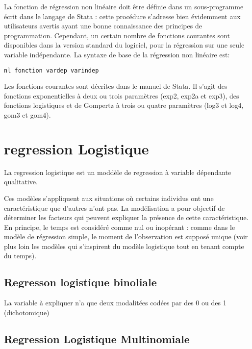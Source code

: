 \documentclass[
]{book}
\begin{document}
La fonction de régression non linéaire doit être définie dans un
sous-programme écrit dans le langage de Stata : cette procédure
s'adresse bien évidemment aux utilisateurs avertis ayant une
bonne connaissance des principes de programmation.
Cependant, un certain nombre de fonctions courantes sont
disponibles dans la version standard du logiciel, pour la
régression sur une seule variable indépendante. La syntaxe de
base de la régression non linéaire est:

\texttt{nl\ fonction\ vardep\ varindep}

Les fonctions courantes sont décrites dans le manuel de Stata. Il
s'agit des fonctions exponentielles à deux ou trois paramètres
(exp2, exp2a et exp3), des fonctions logistiques et de
Gompertz à trois ou quatre paramètres (log3 et log4, gom3 et
gom4).

\hypertarget{regression-logistique}{%
\section{regression Logistique}\label{regression-logistique}}

La regression logistique est un moddèle de regression à variable dépendante qualitative.

Ces modèles s'appliquent aux situations où certains individus
ont une caractéristique que d'autres n'ont pas. La modélisation a
pour objectif de déterminer les facteurs qui peuvent expliquer la
présence de cette caractéristique. En principe, le temps est
considéré comme nul ou inopérant : comme dans le modèle de
régression simple, le moment de l'observation est supposé
unique (voir plus loin les modèles qui s'inspirent du modèle
logistique tout en tenant compte du temps).

\hypertarget{regresson-logistique-binoliale}{%
\subsection{Regresson logistique binoliale}\label{regresson-logistique-binoliale}}

La variable à expliquer n'a que deux modalitées codées par des 0 ou des 1 (dichotomique)

\hypertarget{regression-logistique-multinomiale}{%
\subsection{Regression Logistique Multinomiale}\label{regression-logistique-multinomiale}}
\end{document}

